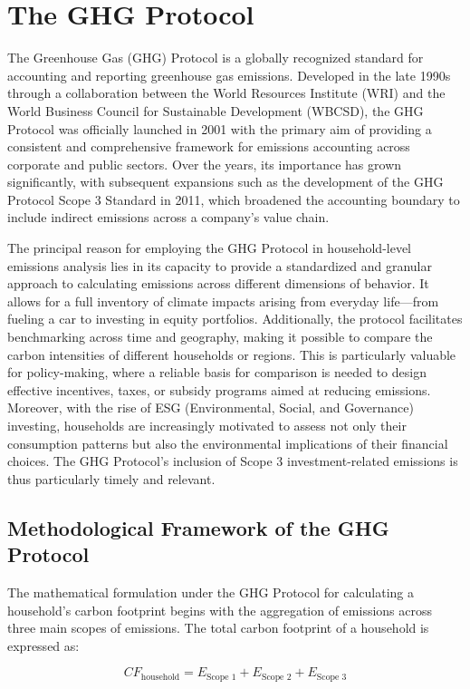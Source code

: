 \documentclass[12pt,a4paper]{article}%
\begin{document}
\section{The GHG Protocol}
The Greenhouse Gas (GHG) Protocol is a globally recognized standard for accounting and reporting greenhouse gas emissions. Developed in the late 1990s through a collaboration between the World Resources Institute (WRI) and the World Business Council for Sustainable Development (WBCSD), the GHG Protocol was officially launched in 2001 with the primary aim of providing a consistent and comprehensive framework for emissions accounting across corporate and public sectors. Over the years, its importance has grown significantly, with subsequent expansions such as the development of the GHG Protocol Scope 3 Standard in 2011, which broadened the accounting boundary to include indirect emissions across a company’s value chain. 

The principal reason for employing the GHG Protocol in household-level emissions analysis lies in its capacity to provide a standardized and granular approach to calculating emissions across different dimensions of behavior. It allows for a full inventory of climate impacts arising from everyday life—from fueling a car to investing in equity portfolios. Additionally, the protocol facilitates benchmarking across time and geography, making it possible to compare the carbon intensities of different households or regions. This is particularly valuable for policy-making, where a reliable basis for comparison is needed to design effective incentives, taxes, or subsidy programs aimed at reducing emissions. Moreover, with the rise of ESG (Environmental, Social, and Governance) investing, households are increasingly motivated to assess not only their consumption patterns but also the environmental implications of their financial choices. The GHG Protocol's inclusion of Scope 3 investment-related emissions is thus particularly timely and relevant.

\subsection{Methodological Framework of the GHG Protocol}
The mathematical formulation under the GHG Protocol for calculating a household’s carbon footprint begins with the aggregation of emissions across three main scopes of emissions. The total carbon footprint of a household is expressed as:

\begin{equation}
CF_{\text{household}} = E_{\text{Scope 1}} + E_{\text{Scope 2}} + E_{\text{Scope 3}}
\end{equation}
\end{document}
